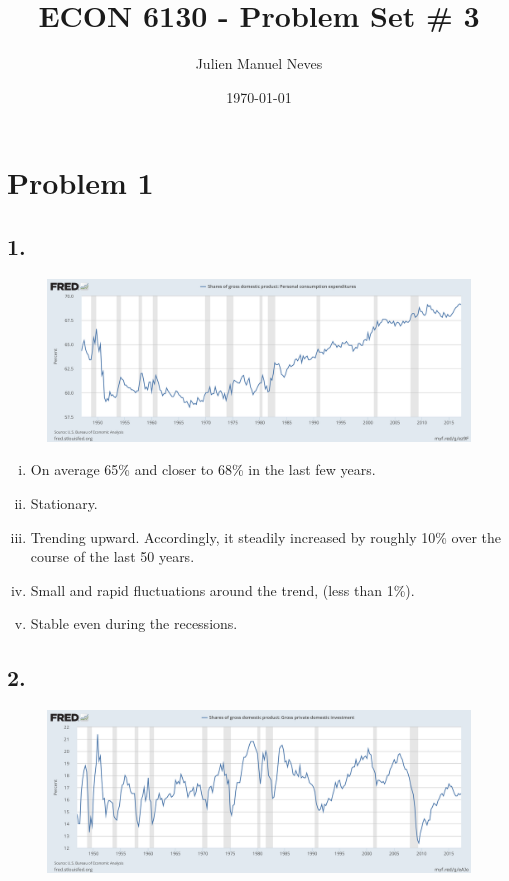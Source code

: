 \documentclass[12pt]{article}
\title{ECON 6130 - Problem Set \# 3}
\date{\today}
\author{Julien Manuel Neves}
\theoremstyle{definition}
\begin{document}
\maketitle

\section*{Problem 1}
\subsection*{1.}
\begin{figure}[H]
	\centering
	\includegraphics[width=0.9\linewidth]{plot1}
	\label{fig:plot1}
\end{figure}

\begin{enumerate}[(i)]
	\item On average 65\% and closer to 68\% in the last few years.
	\item Stationary.
	\item Trending upward. Accordingly, it steadily increased by roughly 10\% over the course of the last 50 years.
	\item Small and rapid fluctuations around the trend, (less than 1\%).
	\item Stable even during the recessions.
\end{enumerate}

\subsection*{2.}
\begin{figure}[H]
	\centering
	\includegraphics[width=0.9\linewidth]{plot2}
	\label{fig:plot2}
\end{figure}
\end{document}
